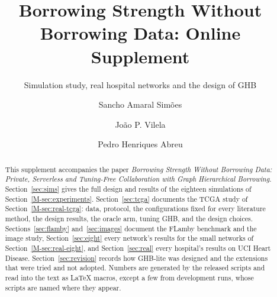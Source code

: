\documentclass[acmsmall,screen,nonacm]{acmart}
\theoremstyle{acmdefinition}
\begin{document}
\title{Borrowing Strength Without Borrowing Data: Online Supplement}
\subtitle{Simulation study, real hospital networks and the design of GHB}

\author{Sancho Amaral Sim\~{o}es}

\author{Jo\~{a}o P. Vilela}

\author{Pedro Henriques Abreu}

\begin{abstract}
This supplement accompanies the paper \emph{Borrowing Strength Without Borrowing Data: Private, Serverless and Tuning-Free Collaboration with Graph Hierarchical Borrowing}. Section~\ref{sec:sims} gives the full design and results of the eighteen simulations of Section~\ref{M-sec:experiments}. Section~\ref{sec:tcga} documents the TCGA study of Section~\ref{M-sec:real-tcga}: data, protocol, the configurations fixed for every literature method, the design results, the oracle arm, tuning GHB, and the design choices. Sections~\ref{sec:flamby} and~\ref{sec:images} document the FLamby benchmark and the image study, Section~\ref{sec:eight} every network's results for the small networks of Section~\ref{M-sec:real-eight}, and Section~\ref{sec:real} every hospital's results on UCI Heart Disease. Section~\ref{sec:revision} records how GHB-lite was designed and the extensions that were tried and not adopted. Numbers are generated by the released scripts and read into the text as LaTeX macros, except a few from development runs, whose scripts are named where they appear.
\end{abstract}

\maketitle
\renewcommand{\shortauthors}{Sim\~{o}es et al.}
\end{document}

